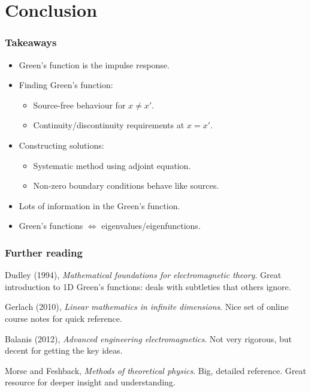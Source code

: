 \documentclass[12 pt, compress, handout, intlimits]{beamer}
\begin{document}
\section{Conclusion}
\label{sec:conclusion}

\note{}

\begin{frame}[fragile]
    \frametitle{Takeaways}
    
    \begin{itemize}
    \item
        Green's function is the impulse response.
    \item
        Finding Green's function:
        \begin{itemize}
        \item
            Source-free behaviour for $ x \neq x' $.
        \item
            Continuity/discontinuity requirements at $ x = x' $.
        \end{itemize}
    \item
        Constructing solutions:
        \begin{itemize}
        \item
            Systematic method using adjoint equation.
        \item
            Non-zero boundary conditions behave like sources.
        \end{itemize}
    \item
        Lots of information in the Green's function.
    \item
        Green's functions $ \Longleftrightarrow $ eigenvalues/eigenfunctions.
    \end{itemize}
    

\end{frame}

\note{}

\begin{frame}[fragile]
    \frametitle{Further reading}

    Dudley (1994), \emph{Mathematical foundations for electromagnetic theory}.
    Great introduction to 1D Green's functions: deals with subtleties that others ignore.

    Gerlach (2010), \emph{Linear mathematics in infinite dimensions}.
    Nice set of online course notes for quick reference.
 
    Balanis (2012), \emph{Advanced engineering electromagnetics}. 
    Not very rigorous, but decent for getting the key ideas.

    Morse and Feshback, \emph{Methods of theoretical physics}.
    Big, detailed reference. 
    Great resource for deeper insight and understanding.
  
\end{frame}
\end{document}
